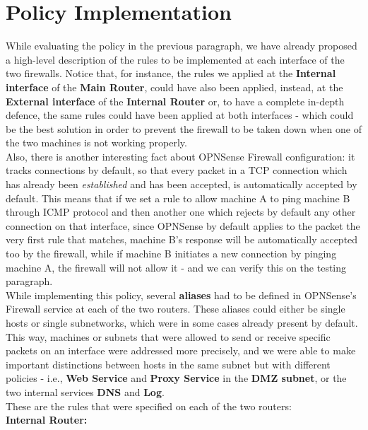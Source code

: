 \section{Policy Implementation}
While evaluating the policy in the previous paragraph, we have already proposed a high-level description of the rules to be implemented at each interface of the two firewalls. Notice that, for instance, the rules we applied at the \textbf{Internal interface} of the \textbf{Main Router}, could have also been applied, instead, at the \textbf{External interface} of the \textbf{Internal Router} or, to have a complete in-depth defence, the same rules could have been applied at both interfaces - which could be the best solution in order to prevent the firewall to be taken down when one of the two machines is not working properly.\\
Also, there is another interesting fact about OPNSense Firewall configuration: it tracks connections by default, so that every packet in a TCP connection which has already been \textit{established} and has been accepted, is automatically accepted by default. This means that if we set a rule to allow machine A to ping machine B through ICMP protocol and then another one which rejects by default any other connection on that interface, since OPNSense by default applies to the packet the very first rule that matches, machine B's response will be automatically accepted too by the firewall, while if machine B initiates a new connection by pinging machine A, the firewall will not allow it - and we can verify this on the testing paragraph.\\
While implementing this policy, several \textbf{aliases} had to be defined in OPNSense's Firewall service at each of the two routers. These aliases could either be single hosts or single subnetworks, which were in some cases already present by default. This way, machines or subnets that were allowed to send or receive specific packets on an interface were addressed more precisely, and we were able to make important distinctions between hosts in the same subnet but with different policies - i.e., \textbf{Web Service} and \textbf{Proxy Service} in the \textbf{DMZ subnet}, or the two internal services \textbf{DNS} and \textbf{Log}.\\
These are the rules that were specified on each of the two routers:\\
\textbf{Internal Router:}
